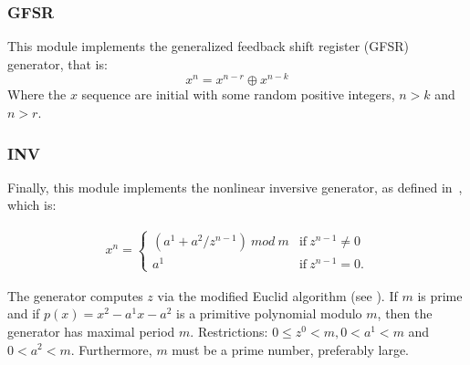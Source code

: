 \subsubsection{GFSR}
This module implements the generalized feedback shift register (GFSR) generator, that is:
\begin{equation}
x^n = x^{n-r} \oplus x^{n-k}
\label{GFSR}
\end{equation}
Where the $x$ sequence are initial with some random positive integers, $n>k$ and $n>r$.

\subsubsection{INV}
Finally, this module implements the nonlinear inversive generator, as defined in~\cite{Lecuyer2009}, which is:

\begin{equation}
\label{INV}
\begin{array}{l}
x^n=\left\{
\begin{array}{ll}
(a^1 + a^2 / z^{n-1})~mod~m & \text{if}~ z^{n-1} \neq 0 \\
a^1 & \text{if}~  z^{n-1} = 0 .\end{array} \right. \end{array}\end{equation}

The generator computes $z$ via the modified Euclid algorithm (see \cite{Lecuyer2009}). If $m$ is prime and if $p(x) = x^2 -a^1 x -a^2$ is a primitive polynomial modulo $m$, then the generator has maximal period $m$. Restrictions: $0 \leq z^0 < m, 0 < a^1 < m$ and $0 < a^2 < m$. Furthermore, $m$ must be a prime number, preferably large.

